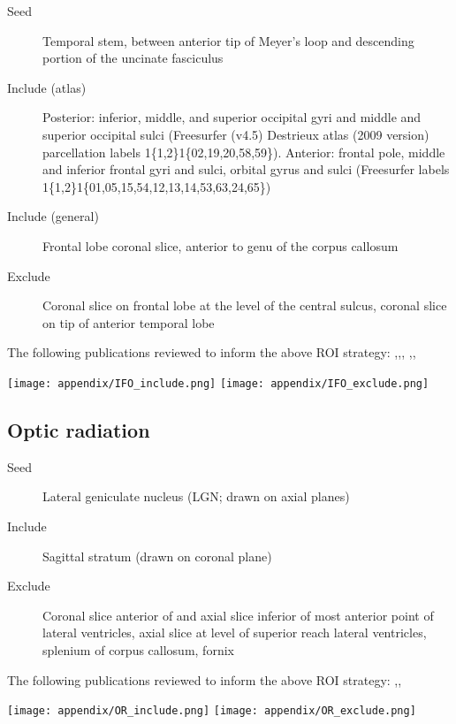 \begin{description}
  \item[Seed] Temporal stem, between anterior tip of Meyer's loop and descending portion of the uncinate fasciculus
  \item[Include (atlas)] Posterior: inferior, middle, and superior occipital gyri and middle and superior occipital sulci (Freesurfer (v4.5) Destrieux atlas\autocite{Destrieux2010} (2009 version) parcellation labels 1\{1,2\}1\{02,19,20,58,59\}).
  Anterior: frontal pole, middle and inferior frontal gyri and sulci, orbital gyrus and sulci (Freesurfer labels 1\{1,2\}1\{01,05,15,54,12,13,14,53,63,24,65\})
  \item[Include (general)] Frontal lobe coronal slice, anterior to genu of the corpus callosum
  \item[Exclude] Coronal slice on frontal lobe at the level of the central sulcus, coronal slice on tip of anterior temporal lobe
\end{description}

The following publications reviewed to inform the above ROI strategy: \textcite{Martino2010},\textcite{Sarubbo2013},\textcite{Hau2016},
\textcite{Catani2008},\textcite{Wakana2007},\textcite{Wu2016}

\begin{figure*}[h]
  \centering
    \texttt{[image: appendix/IFO\_include.png]}
    \texttt{[image: appendix/IFO\_exclude.png]}
  \caption[Inferior fronto-occipital fasciculus tractography ROIs]{Seed (yellow), inclusion (green) and exclusion (red) \glspl{roi} for the inferior fronto-occipital fasciculus}
  \label{fig:rois.ifo}
\end{figure*}

\subsection{Optic radiation}

\begin{description}
  \item[Seed] Lateral geniculate nucleus (LGN; drawn on axial planes)
  \item[Include] Sagittal stratum (drawn on coronal plane)
  \item[Exclude] Coronal slice anterior of and axial slice inferior of most anterior point of lateral ventricles, axial slice at level of superior reach lateral ventricles, splenium of corpus callosum, fornix
\end{description}

The following publications reviewed to inform the above ROI strategy:
\textcite{Yogarajah2009},\textcite{Hofer2010},\textcite{Dayan2015}

\begin{figure*}[h]
  \centering
    \texttt{[image: appendix/OR\_include.png]}
    \texttt{[image: appendix/OR\_exclude.png]}
  \caption[Optic radiation tractography ROIs]{Seed (yellow), inclusion (green) and exclusion (red) regions of interest for the optic radiation}
  \label{fig:rois.or}
\end{figure*}
